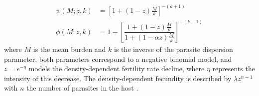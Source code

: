 \documentclass[12pt,a4paper]{article}
\theoremstyle{plain}%
\theoremstyle{definition}
\theoremstyle{remark}
\begin{document}
\begin{itemize}
		
		
		\begin{equation}
		\begin{split}
		\psi(M;z,k)&=\left[ 1+(1-z) \tfrac{M}{k}\right] ^{-(k+1)}\\
		\phi(M;z,k)&=1-\left[ \dfrac{1+(1-z)\frac{M}{k}}{1+(1-\alpha z)\frac{M}{k}}\right] ^{-(k+1)}
		\end{split}
		\end{equation} 
		where $M$ is the mean burden and $k$ is the inverse of the parasite dispersion parameter, 
		both parameters correspond to a negative binomial model,
		and $z = e^{-\eta}$ models the density-dependent fertility rate decline, where $\eta$ represents the intensity of this decrease. The density-dependent fecundity is described by $\lambda z^{n-1}$ with $n$ the number of parasites in the host \cite{hall2000geographical}.
		

\end{itemize}
\end{document}
